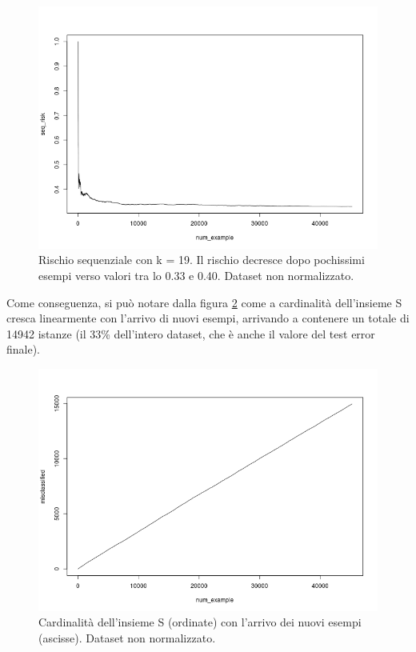\documentclass[fleqn,10pt]{SelfArx} %
\begin{document}
\begin{figure}
\includegraphics[scale=0.35]{knn_online_wo_norm/seq_risk_final.png}
\caption{\footnotesize{Rischio sequenziale con k = 19. Il rischio decresce dopo pochissimi esempi verso valori tra lo 0.33 e 0.40. Dataset non normalizzato.}}
\label{cross:seqrisk}
\end{figure}
Come conseguenza, si può notare dalla figura \ref{cross:misclass} come a cardinalità dell'insieme S cresca linearmente con l'arrivo di nuovi esempi, arrivando a contenere un totale di 14942 istanze (il 33\% dell'intero dataset, che è anche il valore del test error finale).

\begin{figure}
\includegraphics[scale=0.30]{knn_online_wo_norm/misclassified_final.png}
\caption{\footnotesize{Cardinalità dell'insieme S (ordinate) con l'arrivo dei nuovi esempi (ascisse). Dataset non normalizzato.}}
\label{cross:misclass}
\end{figure}
\end{document}

